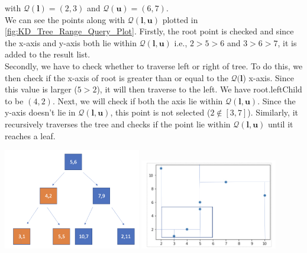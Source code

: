 \begin{mscexample}
\begin{enumerate}
	 with $\mathcal{Q}(\boldsymbol{l}) = (2,3)$ and $\mathcal{Q}(\boldsymbol{u}) = (6,7)$. \\
	 We can see the points along with $\mathcal{Q}(\boldsymbol{l}, \boldsymbol{u})$ plotted in \ref{fig:KD_Tree_Range_Query_Plot}.
	Firstly, the root point is checked and since the x-axis and y-axis both lie within $\mathcal{Q}(\boldsymbol{l}, \boldsymbol{u})$ i.e., $2 > 5 > 6$ and $3 > 6 > 7$, it is added to the result list.\\
	Secondly, we have to check whether to traverse left or  right of tree. To do this, we then check if the x-axis of root is greater than or equal to the $\mathcal{Q}(\boldsymbol{l}$) x-axis. Since this value is larger ($5 > 2$), it will then traverse to the left. We have root.leftChild to be $(4,2)$. Next, we will check if both the axis lie within  $\mathcal{Q}(\boldsymbol{l}, \boldsymbol{u})$. Since the y-axis doesn't lie in $\mathcal{Q}(\boldsymbol{l}, \boldsymbol{u})$, this point is not selected ($2 \notin [3,7]$). Similarly, it recursively traverses the tree and checks if the point lie within $\mathcal{Q}(\boldsymbol{l}, \boldsymbol{u})$ until it reaches a leaf.\\
	
	\begin{minipage}[t]{\linewidth}
        \centering
        \includegraphics[width=6cm]{graphs/Range_Query_Tree_02.png}
        \label{fig:KD-Tree_for_Range_Query_Case2}
        \hfill
        \includegraphics[width=6cm]{graphs/Range_Query_plot_02.png}
        \label{fig:KD_Tree_Range_Query_Plot_Case2}
        \end{minipage}
    

\end{enumerate}
\end{mscexample}
